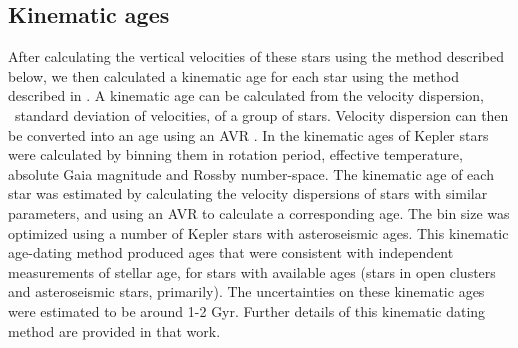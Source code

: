 \subsection{Kinematic ages}
\label{sec:kinematic_ages}

After calculating the vertical velocities of these stars using the method
described below, we then calculated a kinematic age for each star using the
method described in \citet{lu2021}.
A kinematic age can be calculated from the velocity dispersion, \ie\ standard
deviation of velocities, of a group of stars.
Velocity dispersion can then be converted into an age using an AVR
\citep[\eg][]{holmberg2009, yu2018}.
In \citet{lu2021} the kinematic ages of Kepler stars were calculated by
binning them in rotation period, effective temperature, absolute Gaia
magnitude and Rossby number-space.
The kinematic age of each star was estimated by calculating the velocity
dispersions of stars with similar parameters, and using an AVR to calculate a
corresponding age.
The bin size was optimized using a number of Kepler stars with asteroseismic
ages.
This kinematic age-dating method produced ages that were consistent with
independent measurements of stellar age, for stars with available ages (stars
in open clusters and asteroseismic stars, primarily).
The uncertainties on these kinematic ages were estimated to be around 1-2 Gyr.
Further details of this kinematic dating method are provided in that work.



